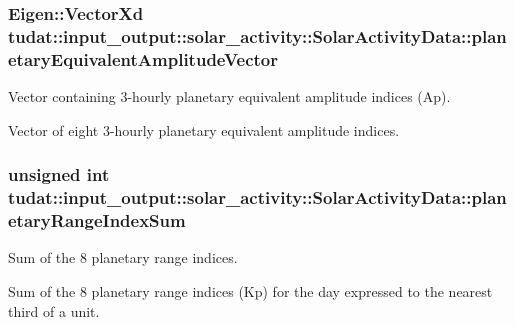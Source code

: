 \subsubsection[{\texorpdfstring{planetary\+Equivalent\+Amplitude\+Vector}{planetaryEquivalentAmplitudeVector}}]{\setlength{\rightskip}{0pt plus 5cm}Eigen\+::\+Vector\+Xd tudat\+::input\+\_\+output\+::solar\+\_\+activity\+::\+Solar\+Activity\+Data\+::planetary\+Equivalent\+Amplitude\+Vector}\hypertarget{structtudat_1_1input__output_1_1solar__activity_1_1SolarActivityData_aa07f46cc182b16ce6850aa0d812e731e}{}\label{structtudat_1_1input__output_1_1solar__activity_1_1SolarActivityData_aa07f46cc182b16ce6850aa0d812e731e}


Vector containing 3-\/hourly planetary equivalent amplitude indices (Ap). 

Vector of eight 3-\/hourly planetary equivalent amplitude indices. 
\subsubsection[{\texorpdfstring{planetary\+Range\+Index\+Sum}{planetaryRangeIndexSum}}]{\setlength{\rightskip}{0pt plus 5cm}unsigned int tudat\+::input\+\_\+output\+::solar\+\_\+activity\+::\+Solar\+Activity\+Data\+::planetary\+Range\+Index\+Sum}\hypertarget{structtudat_1_1input__output_1_1solar__activity_1_1SolarActivityData_a1a8c0e785ff7cf19b1f9c48e583fe638}{}\label{structtudat_1_1input__output_1_1solar__activity_1_1SolarActivityData_a1a8c0e785ff7cf19b1f9c48e583fe638}


Sum of the 8 planetary range indices. 

Sum of the 8 planetary range indices (Kp) for the day expressed to the nearest third of a unit. 
